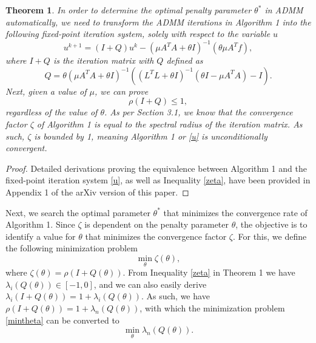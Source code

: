 \documentclass[letterpaper]{article} %
\newtheorem{theorem}{Theorem}
\begin{document}
\begin{theorem}
In order to determine the optimal penalty parameter $\theta^*$ in ADMM automatically, we need to transform the ADMM iterations in Algorithm 1 into the following fixed-point iteration system, solely with respect to the variable $u$
\begin{equation}\label{u}
	u^{k+1} = \left(I+ Q\right) u^{k} - \left(\mu A^T A+\theta I\right)^{-1}\left(\theta \mu A^T f\right),
\end{equation}
where $I+Q$ is the iteration matrix with $Q$ defined as 
\begin{equation}\label{Q}
	Q = \theta (\mu A^T A+\theta I)^{-1} ( ( {L^T}L +\theta I)^{-1} (\theta I -  \mu A^T A ) - I).
\end{equation}
Next, given a value of $\mu$, we can prove 
\begin{equation}\label{zeta}
	\rho\left(I+Q\right)\leq1,
\end{equation}
regardless of the value of $\theta$. As per Section 3.1, we know that the convergence factor $\zeta$ of Algorithm 1 is equal to the spectral radius of the iteration matrix. As such, $\zeta$ is bounded by 1, meaning Algorithm 1 or \eqref{u} is unconditionally convergent.

\end{theorem}

\begin{proof}
 Detailed derivations proving the equivalence between Algorithm 1 and the fixed-point iteration system \eqref{u}, as well as Inequality \eqref{zeta}, have been provided in  Appendix 1 of the arXiv version of this paper.
\end{proof}

Next, we search the optimal parameter $\theta^*$ that minimizes the convergence rate of Algorithm 1. Since $\zeta$ is dependent on the penalty parameter $\theta$, the objective is to identify a value for $\theta$ that minimizes the convergence factor $\zeta$. For this, we define the following minimization problem
\begin{equation} \label{mintheta}
	\min_\theta \zeta\left(\theta\right),
\end{equation}
where $\zeta\left(\theta\right) = \rho \left(I+ Q(\theta)\right)$. From Inequality \eqref{zeta} in Theorem 1 we have $\lambda_i\left(Q(\theta)\right) \in [-1,0]$, and we can also easily derive $\lambda_i \left(I+ Q(\theta)\right) = 1 +  \lambda_i\left(Q(\theta)\right)$. As such, we have $\rho \left(I+ Q(\theta)\right) = 1 +  \lambda_n\left(Q(\theta)\right)$, with which the minimization problem \eqref{mintheta} can be converted to 
\begin{equation} \label{mintheta_1}
	\min_\theta \lambda_n\left(Q(\theta)\right).
\end{equation}
\end{document}
